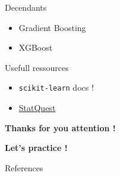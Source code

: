 \documentclass{irdbeamer}
\begin{document}
\begin{frame}{Decendants}
    \begin{itemize}
        \item Gradient Boosting
        \item XGBoost
    \end{itemize}
\end{frame}

\begin{frame}{Usefull ressources}
\begin{itemize}
    \item \texttt{scikit-learn} docs !
    \item \href{https://www.youtube.com/@statquest}{StatQuest}
\end{itemize}
\end{frame}

\begin{frame}[plain]
    \Huge{\textbf{Thanks for you attention !}}
    
    \vfill
    
    \LARGE{\textbf{Let's practice !}}
\end{frame}

\appendix
\begin{frame}[allowframebreaks]{References}
    {\footnotesize \printbibliography[heading=none]}
\end{frame}
\end{document}

